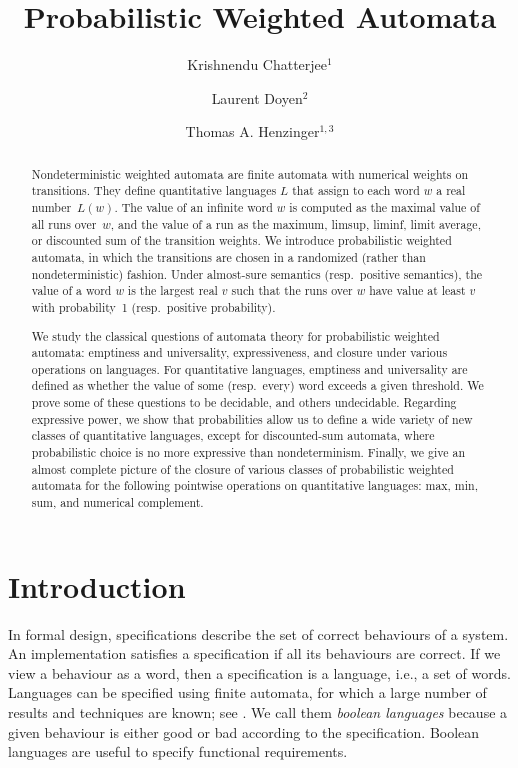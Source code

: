 \documentclass{llncs}
\title{Probabilistic Weighted Automata}
\author{Krishnendu Chatterjee$^{1}$ \and Laurent Doyen$^{2}$ \and Thomas A. Henzinger$^{1,3}$}
\institute{IST Austria (Institute of Science and Technology Austria) \and CNRS, Cachan, France \and
EPFL, Switzerland}
\begin{document}
\pagestyle{plain}
\maketitle

\begin{abstract}
Nondeterministic weighted automata are finite automata with numerical
weights on transitions.  They define quantitative languages $L$ that
assign to each word $w$ a real number~$L(w)$.  The value of an
infinite word $w$ is computed as the maximal value of all runs
over~$w$, and the value of a run as the maximum, limsup, liminf, limit
average, or discounted sum of the transition weights.  We introduce
probabilistic weighted automata, in which the transitions are chosen
in a randomized (rather than nondeterministic) fashion.  Under
almost-sure semantics (resp.\ positive semantics), the value of a word
$w$ is the largest real $v$ such that the runs over $w$ have value at
least $v$ with probability~1 (resp.\ positive probability).

We study the classical questions of automata theory for probabilistic
weighted automata: emptiness and universality, expressiveness, and
closure under various operations on languages.  For quantitative
languages, emptiness and universality are defined as whether the value
of some (resp.\ every) word exceeds a given threshold.  We prove some
of these questions to be decidable, and others undecidable.  Regarding
expressive power, we show that probabilities allow us to define a wide
variety of new classes of quantitative languages, except for
discounted-sum automata, where probabilistic choice is no more
expressive than nondeterminism.  Finally, we give an almost complete
picture of the closure of various classes of probabilistic weighted
automata for the following pointwise operations on quantitative
languages: max, min, sum, and numerical complement.
\end{abstract}



\section{Introduction}

In formal design, specifications describe the set of correct
behaviours of a system.  An implementation satisfies a specification
if all its behaviours are correct.  If we view a behaviour as a word,
then a specification is a language, i.e., a set of words.  Languages
can be specified using finite automata, for which a large number of
results and techniques are known; see \cite{automata,Vardi95}.  We
call them \emph{boolean languages} because a given behaviour is either
good or bad according to the specification.  Boolean languages are
useful to specify functional requirements.
\end{document}
